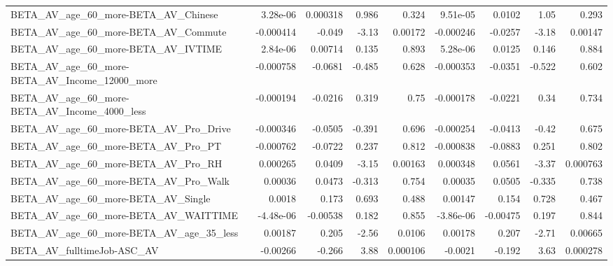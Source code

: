 \begin{tabular}{lrrrrrrrr}
BETA\_AV\_age\_60\_more-BETA\_AV\_Chinese                &    3.28e-06 &     0.000318 &     0.986 &    0.324 &   9.51e-05 &      0.0102 &         1.05 &         0.293 \\
BETA\_AV\_age\_60\_more-BETA\_AV\_Commute                &   -0.000414 &       -0.049 &     -3.13 &  0.00172 &  -0.000246 &     -0.0257 &        -3.18 &       0.00147 \\
BETA\_AV\_age\_60\_more-BETA\_AV\_IVTIME                 &    2.84e-06 &      0.00714 &     0.135 &    0.893 &   5.28e-06 &      0.0125 &        0.146 &         0.884 \\
BETA\_AV\_age\_60\_more-BETA\_AV\_Income\_12000\_more      &   -0.000758 &      -0.0681 &    -0.485 &    0.628 &  -0.000353 &     -0.0351 &       -0.522 &         0.602 \\
BETA\_AV\_age\_60\_more-BETA\_AV\_Income\_4000\_less       &   -0.000194 &      -0.0216 &     0.319 &     0.75 &  -0.000178 &     -0.0221 &         0.34 &         0.734 \\
BETA\_AV\_age\_60\_more-BETA\_AV\_Pro\_Drive              &   -0.000346 &      -0.0505 &    -0.391 &    0.696 &  -0.000254 &     -0.0413 &        -0.42 &         0.675 \\
BETA\_AV\_age\_60\_more-BETA\_AV\_Pro\_PT                 &   -0.000762 &      -0.0722 &     0.237 &    0.812 &  -0.000838 &     -0.0883 &        0.251 &         0.802 \\
BETA\_AV\_age\_60\_more-BETA\_AV\_Pro\_RH                 &    0.000265 &       0.0409 &     -3.15 &  0.00163 &   0.000348 &      0.0561 &        -3.37 &      0.000763 \\
BETA\_AV\_age\_60\_more-BETA\_AV\_Pro\_Walk               &     0.00036 &       0.0473 &    -0.313 &    0.754 &    0.00035 &      0.0505 &       -0.335 &         0.738 \\
BETA\_AV\_age\_60\_more-BETA\_AV\_Single                 &      0.0018 &        0.173 &     0.693 &    0.488 &    0.00147 &       0.154 &        0.728 &         0.467 \\
BETA\_AV\_age\_60\_more-BETA\_AV\_WAITTIME               &   -4.48e-06 &     -0.00538 &     0.182 &    0.855 &  -3.86e-06 &    -0.00475 &        0.197 &         0.844 \\
BETA\_AV\_age\_60\_more-BETA\_AV\_age\_35\_less            &     0.00187 &        0.205 &     -2.56 &   0.0106 &    0.00178 &       0.207 &        -2.71 &       0.00665 \\
BETA\_AV\_fulltimeJob-ASC\_AV                         &    -0.00266 &       -0.266 &      3.88 & 0.000106 &    -0.0021 &      -0.192 &         3.63 &      0.000278 \\

\end{tabular}
